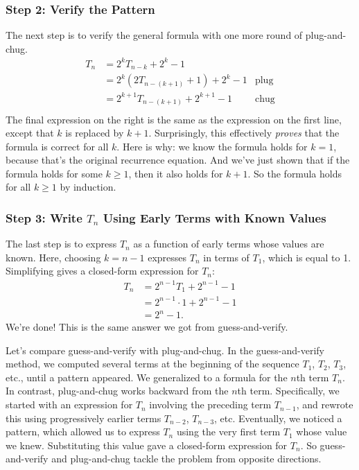 \subsubsection*{Step 2:  Verify the Pattern}

The next step is to verify the general formula with one more round of plug-and-chug.
\begin{align*}
T_n & = 2^k T_{n-k} + 2^k - 1 \\
  & = 2^k (2 T_{n-(k+1)} + 1) + 2^k - 1 & \text{plug} \\
  & = 2^{k+1} T_{n-(k+1)} + 2^{k+1} - 1 & \text{chug} \\
\end{align*}
The final expression on the right is the same as the expression on the
first line, except that $k$ is replaced by $k+1$.  Surprisingly, this
effectively \emph{proves} that the formula is correct for all $k$.
Here is why: we know the formula holds for $k = 1$, because that's the
original recurrence equation.  And we've just shown that if the
formula holds for some $k \geq 1$, then it also holds for $k + 1$.  So
the formula holds for all $k \geq 1$ by induction.

\subsubsection*{Step 3: Write $T_n$ Using Early Terms with Known Values}

The last step is to express $T_n$ as a function of early terms whose
values are known.  Here, choosing $k = n - 1$ expresses $T_n$ in terms
of $T_1$, which is equal to 1.  Simplifying gives a closed-form
expression for $T_n$:
\begin{align*}
T_n & = 2^{n - 1} T_1 + 2^{n-1} - 1 \\
  & = 2^{n-1} \cdot 1 + 2^{n-1} - 1 \\
  & = 2^n - 1.
\end{align*}
We're done!  This is the same answer we got from guess-and-verify.

\medskip

Let's compare guess-and-verify with plug-and-chug.  In the
guess-and-verify method, we computed several terms at the beginning of
the sequence $T_1$, $T_2$, $T_3$, etc., until a pattern appeared.  We
generalized to a formula for the $n$th term $T_n$.  In contrast,
plug-and-chug works backward from the $n$th term.  Specifically, we
started with an expression for $T_n$ involving the preceding term
$T_{n-1}$, and rewrote this using progressively earlier terms
$T_{n-2}$, $T_{n-3}$, etc.  Eventually, we noticed a pattern, which
allowed us to express $T_n$ using the very first term $T_1$ whose
value we knew.  Substituting this value gave a closed-form expression
for $T_n$.  So guess-and-verify and plug-and-chug tackle the problem
from opposite directions.

